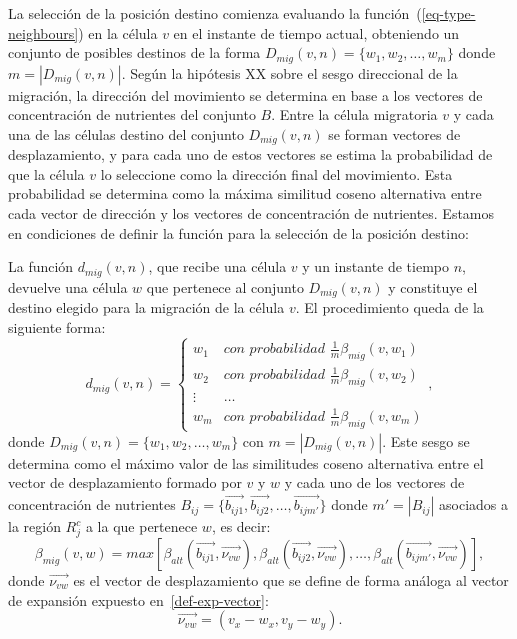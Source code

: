La selecci\'on de la posici\'on destino comienza evaluando la funci\'on~(\ref{eq-type-neighbours}) en la c\'elula $v$ en el instante de tiempo actual, obteniendo un conjunto de posibles destinos de la forma $D_{mig}(v,n) = \lbrace w_1, w_2, \ldots, w_m \rbrace$ donde $m=|D_{mig}(v,n)|$. Seg\'un la hip\'otesis XX sobre el sesgo direccional de la migraci\'on, la direcci\'on del movimiento se determina en base a los vectores de concentraci\'on de nutrientes del conjunto $B$. Entre la c\'elula migratoria $v$ y cada una de las c\'elulas destino del conjunto $D_{mig}(v,n)$ se forman vectores de desplazamiento, y para cada uno de estos vectores se estima la probabilidad de que la c\'elula $v$ lo seleccione como la direcci\'on final del movimiento. Esta probabilidad se determina como la m\'axima similitud coseno alternativa entre cada vector de direcci\'on y los vectores de concentraci\'on de nutrientes. Estamos en condiciones de definir la funci\'on para la selecci\'on de la posici\'on destino:

\begin{definition}
\label{def-dest-selection}
La funci\'on $d_{mig}(v,n)$, que recibe una c\'elula $v$ y un instante de tiempo $n$, devuelve una c\'elula $w$ que pertenece al conjunto $D_{mig}(v,n)$ y constituye el destino elegido para la migraci\'on de la c\'elula $v$. El procedimiento queda de la siguiente forma:
\begin{equation}
d_{mig}(v,n) = \left\lbrace
	\begin{array}{ll}
		w_1 & \textit{con probabilidad } \frac{1}{m} \beta_{mig}(v,w_1)\\
		w_2 & \textit{con probabilidad } \frac{1}{m} \beta_{mig}(v,w_2)\\
		\vdots & \ldots\\
		w_m & \textit{con probabilidad } \frac{1}{m} \beta_{mig}(v,w_m)
	\end{array}
\right., \label{eq-dest-selection}
\end{equation}
donde $D_{mig}(v,n)= \lbrace w_1,w_2,\ldots,w_m \rbrace$ con $m = |D_{mig}(v,n)|$. Este sesgo se determina como el m\'aximo valor de las similitudes coseno alternativa entre el vector de desplazamiento formado por $v$ y $w$ y cada uno de los vectores de concentraci\'on de nutrientes $B_{ij} = \lbrace \overrightarrow{b_{ij1}}, \overrightarrow{b_{ij2}}, \ldots, \overrightarrow{b_{ijm'}} \rbrace$ donde $m'=|B_{ij}|$ asociados a la regi\'on $R_j^c$ a la que pertenece $w$, es decir:
\begin{equation}
\beta_{mig}(v,w) = max\left[\beta_{alt}(\overrightarrow{b_{ij1}},\overrightarrow{\nu_{vw}}), \beta_{alt}(\overrightarrow{b_{ij2}},\overrightarrow{\nu_{vw}}), \ldots, \beta_{alt}(\overrightarrow{b_{ijm'}},\overrightarrow{\nu_{vw}})\right], \label{eq-dest-selection-2}
\end{equation}
donde $\overrightarrow{\nu_{vw}}$ es el vector de desplazamiento que se define de forma an\'aloga al vector de expansi\'on expuesto en~\ref{def-exp-vector}:
\begin{equation}
\overrightarrow{\nu_{vw}} = \left(v_x - w_{x}, v_y - w_{y}\right). \label{eq-dest-selection-vector}
\end{equation}
\end{definition}

